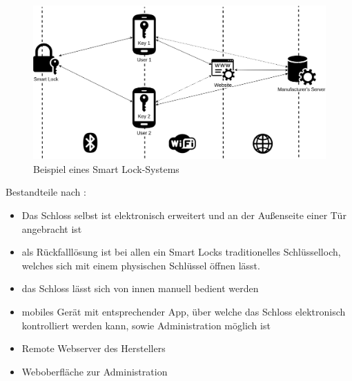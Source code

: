 		\begin{figure}[H]
	    	\centering
	    	\includegraphics[width=\textwidth]{graphics/sl_arch.png}
	    	\caption{Beispiel eines Smart Lock-Systems}
	    	\label{fig:sl_arch}
	    \end{figure}

		Bestandteile nach \citeauthor{Ho2016}:
		\begin{itemize}
		    \item Das Schloss selbst ist elektronisch erweitert und  an der Außenseite einer Tür angebracht ist
		    \item als Rückfalllösung ist bei allen ein Smart Locks traditionelles Schlüsselloch, welches sich mit einem physischen Schlüssel öffnen lässt.
		    \item das Schloss lässt sich von innen manuell bedient werden
		    \item mobiles Gerät mit entsprechender App, über welche das Schloss elektronisch kontrolliert werden kann, sowie Administration möglich ist
		    \item Remote Webserver des Herstellers
		    \item Weboberfläche zur Administration
		\end{itemize}

